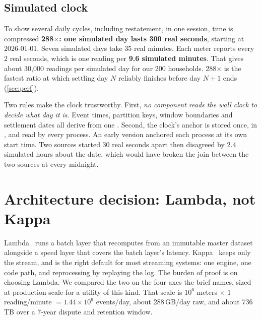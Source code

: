 \documentclass[11pt,a4paper]{article}
\newcommand{\code}[1]{\texttt{\detokenize{#1}}}
\begin{document}
\subsection{Simulated clock}
\label{sec:clock}

To show several daily cycles, including restatement, in one session, time is
compressed \textbf{288$\times$: one simulated day lasts 300 real seconds}, starting at
2026-01-01. Seven simulated days take 35 real minutes. Each meter reports every 2
real seconds, which is one reading per \textbf{9.6 simulated minutes}. That gives
about 30{,}000 readings per simulated day for our 200 households. 288$\times$ is the
fastest ratio at which settling day $N$ reliably finishes before day $N{+}1$ ends
(\cref{sec:perf}).

Two rules make the clock trustworthy. First, \emph{no component reads the wall clock
to decide what day it is}. Event times, partition keys, window boundaries and
settlement dates all derive from one \code{SimulatedClock}. Second, the clock's
anchor is stored once, in \code{ops.sim_clock}, and read by every process. An early
version anchored each process at its own start time. Two sources started 30 real
seconds apart then disagreed by 2.4 simulated hours about the date, which would have
broken the join between the two sources at every midnight.

\section{Architecture decision: Lambda, not Kappa}
\label{sec:decision}

Lambda~\cite{marz2015} runs a batch layer that recomputes from an immutable master
dataset alongside a speed layer that covers the batch layer's latency. Kappa~\cite{kreps2014}
keeps only the stream, and is the right default for most streaming systems: one engine,
one code path, and reprocessing by replaying the log. The burden of proof is on
choosing Lambda.
We compared the two on the four axes the brief names, sized at production scale
for a utility of this kind. That scale is $10^6$ meters $\times$ 1 reading/minute
$=1.44\times10^9$ events/day, about 288\,GB/day raw, and about 736\,TB over a
7-year dispute and retention window.
\end{document}
